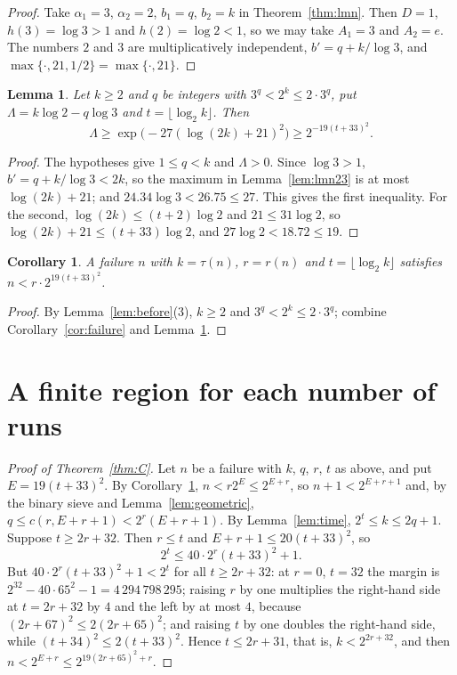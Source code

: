 \documentclass[11pt]{amsart}
\newtheorem{lemma}[theorem]{Lemma}
\newtheorem{corollary}[theorem]{Corollary}
\theoremstyle{definition}
\theoremstyle{remark}
\begin{document}
\begin{proof}
Take $\alpha_1=3$, $\alpha_2=2$, $b_1=q$, $b_2=k$ in Theorem~\ref{thm:lmn}. Then $D=1$, $h(3)=\log3>1$ and $h(2)=\log2<1$, so we may take $A_1=3$ and $A_2=e$. The numbers $2$ and $3$ are multiplicatively independent, $b'=q+k/\log3$, and $\max\{\cdot,21,1/2\}=\max\{\cdot,21\}$.
\end{proof}

\begin{lemma}\label{lem:weak}
Let $k\ge2$ and $q$ be integers with $3^{q}<2^{k}\le2\cdot3^{q}$, put $\Lambda=k\log2-q\log3$ and $t=\lfloor\log_2k\rfloor$. Then
\[
\Lambda\ge\exp\bigl(-27(\log(2k)+21)^{2}\bigr)\ge2^{-19(t+33)^{2}}.
\]
\end{lemma}

\begin{proof}
The hypotheses give $1\le q<k$ and $\Lambda>0$. Since $\log3>1$, $b'=q+k/\log3<2k$, so the maximum in Lemma~\ref{lem:lmn23} is at most $\log(2k)+21$; and $24.34\log3<26.75\le27$. This gives the first inequality. For the second, $\log(2k)\le(t+2)\log2$ and $21\le31\log2$, so $\log(2k)+21\le(t+33)\log2$, and $27\log2<18.72\le19$.
\end{proof}

\begin{corollary}\label{cor:lmnfail}
A failure $n$ with $k=\tau(n)$, $r=r(n)$ and $t=\lfloor\log_2k\rfloor$ satisfies $n<r\cdot2^{19(t+33)^{2}}$.
\end{corollary}

\begin{proof}
By Lemma~\ref{lem:before}(3), $k\ge2$ and $3^{q}<2^{k}\le2\cdot3^{q}$; combine Corollary~\ref{cor:failure} and Lemma~\ref{lem:weak}.
\end{proof}

\section{A finite region for each number of runs}\label{sec:region}

\begin{proof}[Proof of Theorem~\ref{thm:C}]
Let $n$ be a failure with $k$, $q$, $r$, $t$ as above, and put $E=19(t+33)^{2}$. By Corollary~\ref{cor:lmnfail}, $n<r2^{E}\le2^{E+r}$, so $n+1<2^{E+r+1}$ and, by the binary sieve and Lemma~\ref{lem:geometric}, $q\le c(r,E+r+1)<2^{r}(E+r+1)$. By Lemma~\ref{lem:time}, $2^{t}\le k\le2q+1$. Suppose $t\ge2r+32$. Then $r\le t$ and $E+r+1\le20(t+33)^{2}$, so
\[
2^{t}\le40\cdot2^{r}(t+33)^{2}+1 .
\]
But $40\cdot2^{r}(t+33)^{2}+1<2^{t}$ for all $t\ge2r+32$: at $r=0$, $t=32$ the margin is $2^{32}-40\cdot65^{2}-1=4\,294\,798\,295$; raising $r$ by one multiplies the right-hand side at $t=2r+32$ by $4$ and the left by at most $4$, because $(2r+67)^{2}\le2(2r+65)^{2}$; and raising $t$ by one doubles the right-hand side, while $(t+34)^{2}\le2(t+33)^{2}$. Hence $t\le2r+31$, that is, $k<2^{2r+32}$, and then $n<2^{E+r}\le2^{19(2r+65)^{2}+r}$.
\end{proof}
\end{document}
